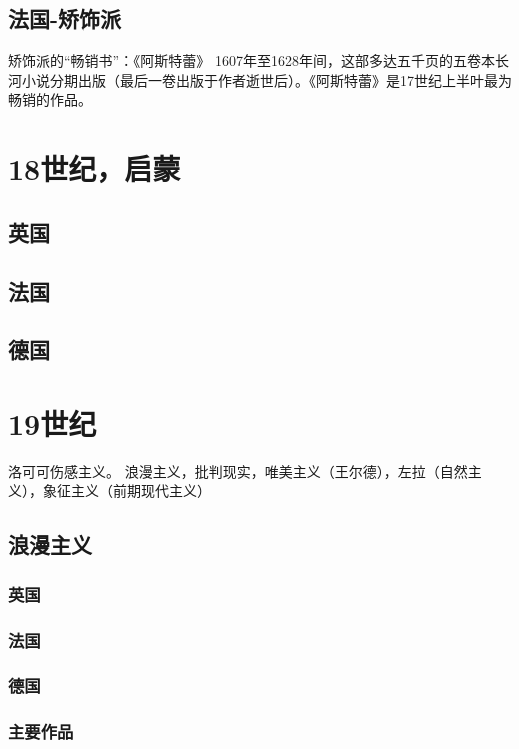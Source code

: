 \documentclass[UTF8]{../../RepresentationUniverse}
\begin{document}
\section{法国-矫饰派}


矫饰派的“畅销书”：《阿斯特蕾》
1607年至1628年间，这部多达五千页的五卷本长河小说分期出版（最后一卷出版于作者逝世后）。《阿斯特蕾》是17世纪上半叶最为畅销的作品。


\chapter{18世纪，启蒙}


\section{英国}

\section{法国}

\section{德国}



\chapter{19世纪}

洛可可伤感主义。
浪漫主义，批判现实，唯美主义（王尔德），左拉（自然主义），象征主义（前期现代主义）


\section{浪漫主义}


\subsection{英国}

\subsection{法国}

\subsection{德国}

\subsection{主要作品}
\end{document}
